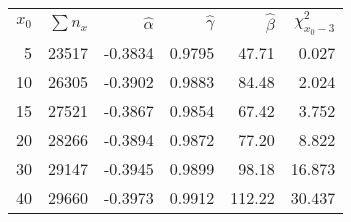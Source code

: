 \begin{tabular}{rrrrrr}
$x_0$ & $\sum n_x$ & $\hat\alpha$ & $\hat\gamma$ & $\hat\beta$ & $\chi_{x_0-3}^2$\\[3mm]
 5  & 23517  & -0.3834 &  0.9795 &   47.71 &   0.027\\
10  & 26305  & -0.3902 &  0.9883 &   84.48 &   2.024\\
15  & 27521  & -0.3867 &  0.9854 &   67.42 &   3.752\\
20  & 28266  & -0.3894 &  0.9872 &   77.20 &   8.822\\
30  & 29147  & -0.3945 &  0.9899 &   98.18 &  16.873\\
40  & 29660  & -0.3973 &  0.9912 &  112.22 &  30.437\\
\end{tabular}

